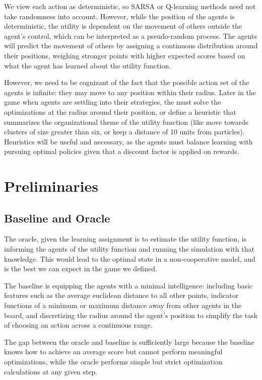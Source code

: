 \documentclass[10pt]{amsart}
\theoremstyle{definition}
\begin{document}
We view each action as deterministic, so SARSA or Q-learning methods need not take randomness into account. However, while the position of the agents is deterministic, the utility is dependent on the movement of others outside the agent's control, which can be interpreted as a pseudo-random process. The agents will predict the movement of others by assigning a continuous distribution around their positions, weighing stronger points with higher expected scores based on what the agent has learned about the utility function.

However, we need to be cognizant of the fact that the possible action set of the agents is infinite: they may move to any position within their radius. Later in the game when agents are settling into their strategies, the must solve the optimizations at the radius around their position, or define a heuristic that summarizes the organizational theme of the utility function (like move towards clusters of size greater than six, or keep a distance of 10 units from particles). Heuristics will be useful and necessary, as the agents must balance learning with pursuing optimal policies given that a discount factor is applied on rewards.

\section{Preliminaries}

\subsection{Baseline and Oracle} 

The oracle, given the learning assignment is to estimate the utility function, is informing the agents of the utility function and running the simulation with that knowledge. This would lead to the optimal state in a non-cooperative model, and is the best we can expect in the game we defined.

The baseline is equipping the agents with a minimal intelligence: including basic features such as the average euclidean distance to all other points, indicator functions of a minimum or maximum distance away from other agents in the board, and discretizing the radius around the agent's position to simplify the task of choosing an action across a continuous range.

The gap between the oracle and baseline is sufficiently large because the baseline knows how to achieve an average score but cannot perform meaningful optimizations, while the oracle performs simple but strict optimization calculations at any given step.
\end{document}
